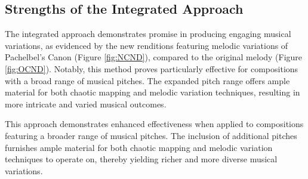 \documentclass[11pt]{article}
\theoremstyle{definition}
\begin{document}
\subsection{Strengths of the Integrated Approach}

The integrated approach demonstrates promise in producing engaging musical variations, as evidenced by the new renditions featuring melodic variations of Pachelbel's Canon \cite{pachelbel_canon_2005} (Figure \ref{fig:NCND}), compared to the original melody (Figure \ref{fig:OCND}). 
Notably, this method proves particularly effective for compositions with a broad range of musical pitches. The expanded pitch range offers ample material for both chaotic mapping and melodic variation techniques, resulting in more intricate and varied musical outcomes.

This approach demonstrates enhanced effectiveness when applied to compositions featuring a broader range of musical pitches. The inclusion of additional pitches furnishes ample material for both chaotic mapping and melodic variation techniques to operate on, thereby yielding richer and more diverse musical variations.
\end{document}
